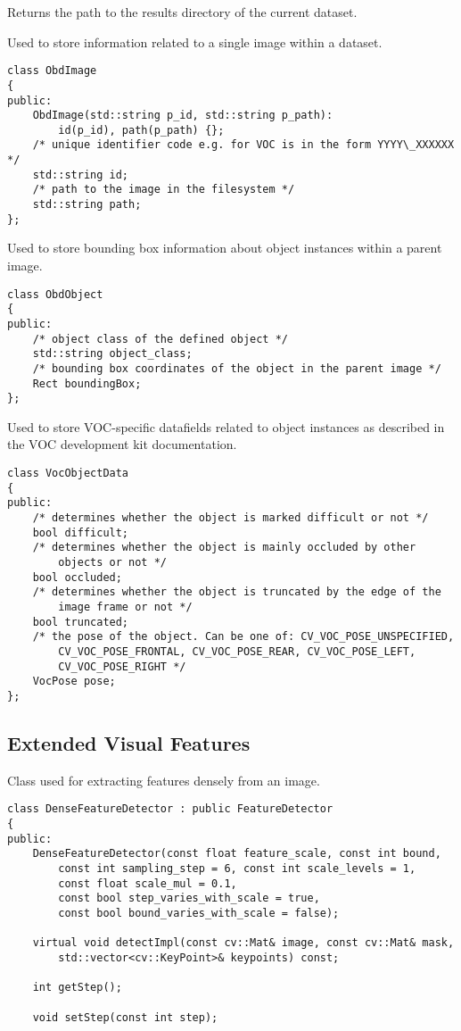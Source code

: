 
Returns the path to the results directory of the current dataset.


Used to store information related to a single image within a dataset.

\begin{lstlisting}
class ObdImage
{
public:
    ObdImage(std::string p_id, std::string p_path):
        id(p_id), path(p_path) {};
    /* unique identifier code e.g. for VOC is in the form YYYY\_XXXXXX */
    std::string id;
    /* path to the image in the filesystem */
    std::string path;
};
\end{lstlisting}

Used to store bounding box information about object instances within a parent image.

\begin{lstlisting}
class ObdObject
{
public:
    /* object class of the defined object */
    std::string object_class;
    /* bounding box coordinates of the object in the parent image */
    Rect boundingBox;
};
\end{lstlisting}

Used to store VOC-specific datafields related to object instances as described in the VOC development kit documentation.

\begin{lstlisting}
class VocObjectData
{
public:
    /* determines whether the object is marked difficult or not */
    bool difficult;
    /* determines whether the object is mainly occluded by other
        objects or not */
    bool occluded;
    /* determines whether the object is truncated by the edge of the
        image frame or not */
    bool truncated;
    /* the pose of the object. Can be one of: CV_VOC_POSE_UNSPECIFIED,
        CV_VOC_POSE_FRONTAL, CV_VOC_POSE_REAR, CV_VOC_POSE_LEFT,
        CV_VOC_POSE_RIGHT */
    VocPose pose;
};
\end{lstlisting}

\subsection{Extended Visual Features}

Class used for extracting features densely from an image.

\begin{lstlisting}
class DenseFeatureDetector : public FeatureDetector
{
public:
    DenseFeatureDetector(const float feature_scale, const int bound,
        const int sampling_step = 6, const int scale_levels = 1,
        const float scale_mul = 0.1,
        const bool step_varies_with_scale = true,
        const bool bound_varies_with_scale = false);

    virtual void detectImpl(const cv::Mat& image, const cv::Mat& mask,
        std::vector<cv::KeyPoint>& keypoints) const;

    int getStep();

    void setStep(const int step);
\end{lstlisting}

